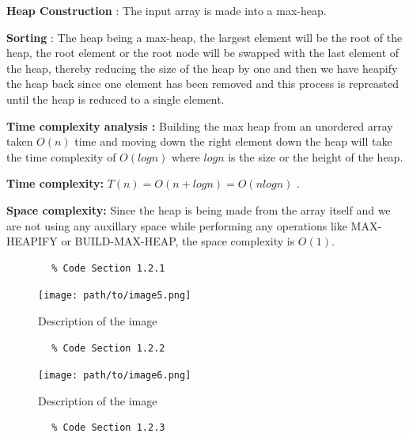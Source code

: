 \documentclass{article}
\begin{document}
\begin{enumerate}
\begin{enumerate}[label*=\arabic*.]
          \textbf{Heap Construction} : The input array is made into a max-heap. 

          \textbf{Sorting} : The heap being a max-heap, the largest element will be the root of the heap, the root element or the root node will be swapped with the last element of the heap, thereby reducing the size of the heap by one and then we have heapify the heap back since one element has been removed and this process is repreasted until the heap is reduced to a single element. 

          \textbf{Time complexity analysis : } Building the max heap from an unordered array taken \( O(n) \) time and moving down the right element down the heap will take the time complexity of \( O(log n) \) where \( logn \) is the size or the height of the heap. 

        \textbf{ Time complexity:} \( T(n) = O(n + logn) = O(n logn) \) .

          \textbf{ Space complexity:} Since the heap is being made from the array itself and we are not using any auxillary space while performing any operations like MAX-HEAPIFY or BUILD-MAX-HEAP, the space complexity is \( O(1) \).

        \begin{verbatim}
        % Code Section 1.2.1
        \end{verbatim}

        \begin{figure}[h]
            \centering
            \texttt{[image: path/to/image5.png]}
            \caption{Description of the image}
            \label{fig:image5}
        \end{figure}

        \begin{verbatim}
        % Code Section 1.2.2
        \end{verbatim}

        \begin{figure}[h]
            \centering
            \texttt{[image: path/to/image6.png]}
            \caption{Description of the image}
            \label{fig:image6}
        \end{figure}

        \begin{verbatim}
        % Code Section 1.2.3
        \end{verbatim}


\end{enumerate}
\end{enumerate}
\end{document}
